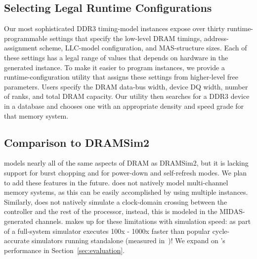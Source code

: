\subsection{Selecting Legal Runtime Configurations}
Our most sophisticated DDR3 timing-model instances expose over thirty
runtime-programmable settings that specify the low-level DRAM timings,
address-assignment scheme, LLC-model configuration, and MAS-structure sizes.
Each of these settings has a legal range of values that depends on hardware in
the generated instance. To make it easier to program instances, we provide a
runtime-configuration utility that assigns these settings
from higher-level free parameters.
Users specify the DRAM data-bus width,
device DQ width, number of ranks, and total DRAM capacity. Our utility
then searches for a DDR3 device in a database and chooses one with an appropriate
density and speed grade for that memory system.

\subsection{Comparison to DRAMSim2} \PNAME models nearly all of the same
aspects of DRAM as DRAMSim2, but it is lacking support for burst
chopping and for power-down and self-refresh modes.
We plan to add these features in the future. \PNAME does not natively model
multi-channel memory systems, as this can be easily accomplished by using
multiple instances. Similarly, \PNAME does not natively simulate a clock-domain
crossing between the controller and the rest of the processor, instead, this is modeled in the MIDAS-generated channels.  \PNAME makes up for these
limitations with simulation speed: as part of a full-system
simulator \PNAME executes  100x - 1000x faster than popular cycle-accurate
simulators running standalone (measured in~\cite{ramulator})! We expand on
\PNAME's performance in Section~\ref{sec:evaluation}.
